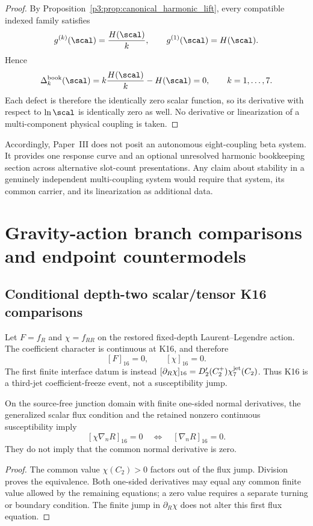\documentclass[11pt,a4paper]{article}
\begin{document}
\begin{proof}
By Proposition~\ref{p3:prop:canonical_harmonic_lift}, every compatible indexed
family satisfies
\[
 g^{(k)}(\scal)=\frac{H(\scal)}k,
 \qquad
 g^{(1)}(\scal)=H(\scal).
\]
Hence
\[
 \Delta_k^{\rm book}(\scal)
 =k\frac{H(\scal)}k-H(\scal)=0,
 \qquad k=1,\dots,7.
\]
Each defect is therefore the identically zero scalar function, so its
derivative with respect to \(\ln\scal\) is identically zero as well.  No
derivative or linearization of a multi-component physical coupling is taken.
\end{proof}

Accordingly, Paper~III does not posit an autonomous eight-coupling beta
system.  It provides one response curve and an optional unresolved harmonic
bookkeeping section across alternative slot-count presentations.  Any claim
about stability in a genuinely independent multi-coupling system would require
that system, its common carrier, and its linearization as additional data.


\begingroup
\small
\RaggedRight
\setlength{\emergencystretch}{3em}

\endgroup



\section{Gravity-action branch comparisons and endpoint countermodels}
\label{p3g:sec:gravity}
\subsection{Conditional depth-two scalar/tensor K16 comparisons}
\label{p3e:sec:v189-k16-scalar-tensor-content}
Let $F=f_R$ and $\chi=f_{RR}$ on the restored fixed-depth Laurent--Legendre
action.  The coefficient character is continuous at K16, and therefore
\[
 \boxed{[F]_{16}=0,\qquad [\chi]_{16}=0.}
\]
The first finite interface datum is instead
$[\partial_R\chi]_{16}=D_2'(C_2^+)\chi_7^{\rm jet}(C_2)$.
Thus K16 is a third-jet coefficient-freeze event, not a susceptibility jump.

\begin{proposition}
\label{p3e:prop:v2216-k16-derivative-continuity}
On the source-free junction domain with finite one-sided normal derivatives,
the generalized scalar flux condition and the retained nonzero continuous
susceptibility imply
\[
 [\chi\nabla_nR]_{16}=0
 \quad\Longleftrightarrow\quad [\nabla_nR]_{16}=0.
\]
They do not imply that the common normal derivative is zero.
\end{proposition}
\begin{proof}
The common value $\chi(C_2)>0$ factors out of the flux jump. Division
proves the equivalence. Both one-sided derivatives may equal any common
finite value allowed by the remaining equations; a zero value requires a
separate turning or boundary condition. The finite jump in
$\partial_R\chi$ does not alter this first flux equation.
\end{proof}
\end{document}
